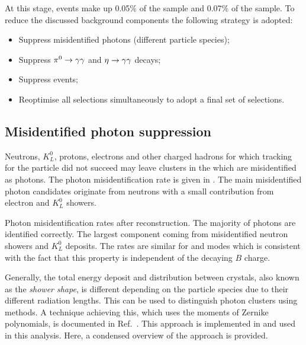 At this stage, \BtoXsgamma events make up 0.05\% of the \feiBp sample and 0.07\% of the \feiBz sample.
To reduce the discussed background components the following strategy is adopted:
\begin{itemize}
    \item Suppress misidentified photons (different particle species);
    \item Suppress $\pi^0\rightarrow\gamma\gamma$ and $\eta\rightarrow\gamma\gamma$ decays;
    \item Suppress \epem\ra\qqbar events;
    \item Reoptimise all selections simultaneously to adopt a final set of selections.
\end{itemize}

\subsection{Misidentified photon suppression}\label{sec:selection_clusZMVA}

Neutrons, $K_L^0$, protons, electrons and other charged hadrons for which tracking for the particle did not succeed may leave clusters in the \ECL which are misidentified as photons.
The photon misidentification rate is given in .
The main misidentified photon candidates originate from neutrons with a small contribution from electron and $K_L^0$ showers.

\begin{table}[hbtp!]
    \centering
    \caption{\label{tab:misidentified_photons} Photon misidentification rates after reconstruction.
    The majority of photons are identified correctly. The largest component coming from misidentified neutron showers and $K_L^0$ deposits.
    The rates are similar for \feiBp and \feiBz modes which is consistent with the fact that this property is independent of the decaying $B$ charge.}
    
\end{table}

Generally, the total energy deposit and distribution between \ECL crystals, also known as the \textit{shower shape}, is different depending on the particle species due to their different radiation lengths.
This can be used to distinguish photon clusters using \MVA methods.
A technique achieving this, which uses the moments of Zernike polynomials, is documented in Ref.~\cite{Hershenhorn:2468}.
This approach is implemented in \basftwo and used in this analysis.
Here, a condensed overview of the approach is provided.

